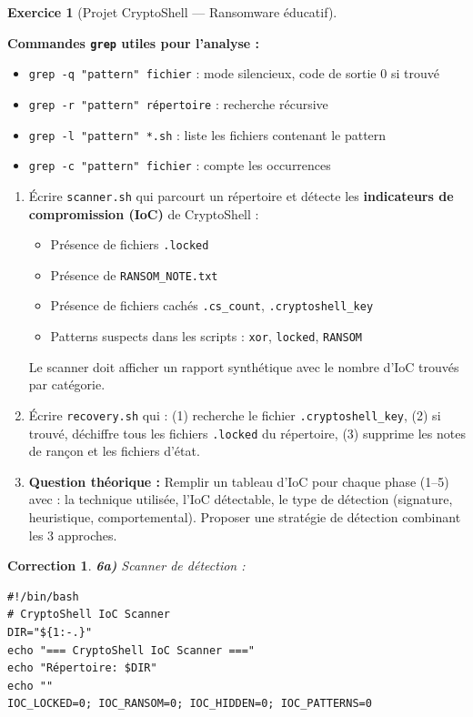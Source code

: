 \documentclass[a4paper,11pt]{article}
\theoremstyle{plain}
\newtheorem{correction}{Correction}
\theoremstyle{definition}
\newtheorem{exercice}{Exercice}
\begin{document}
\begin{exercice}[Projet CryptoShell --- Ransomware éducatif]
\begin{rappel}
\medskip
\textbf{Commandes \texttt{grep} utiles pour l'analyse :}
\begin{itemize}
    \item \texttt{grep -q "pattern" fichier} : mode silencieux, code de sortie 0 si trouvé
    \item \texttt{grep -r "pattern" répertoire} : recherche récursive
    \item \texttt{grep -l "pattern" *.sh} : liste les fichiers contenant le pattern
    \item \texttt{grep -c "pattern" fichier} : compte les occurrences
\end{itemize}
\end{rappel}

\begin{enumerate}
\item[\textbf{6a)}] Écrire \texttt{scanner.sh} qui parcourt un répertoire et détecte les \textbf{indicateurs de compromission (IoC)} de CryptoShell :
\begin{itemize}
    \item Présence de fichiers \texttt{.locked}
    \item Présence de \texttt{RANSOM\_NOTE.txt}
    \item Présence de fichiers cachés \texttt{.cs\_count}, \texttt{.cryptoshell\_key}
    \item Patterns suspects dans les scripts : \texttt{xor}, \texttt{locked}, \texttt{RANSOM}
\end{itemize}
Le scanner doit afficher un rapport synthétique avec le nombre d'IoC trouvés par catégorie.

\item[\textbf{6b)}] Écrire \texttt{recovery.sh} qui : (1) recherche le fichier \texttt{.cryptoshell\_key}, (2) si trouvé, déchiffre tous les fichiers \texttt{.locked} du répertoire, (3) supprime les notes de rançon et les fichiers d'état.

\item[\textbf{6c)}] \textbf{Question théorique :} Remplir un tableau d'IoC pour chaque phase (1--5) avec : la technique utilisée, l'IoC détectable, le type de détection (signature, heuristique, comportemental). Proposer une stratégie de détection combinant les 3 approches.
\end{enumerate}

\begin{correction}

\textbf{6a)} Scanner de détection :
\begin{lstlisting}[title=scanner.sh (phase6\_scanner.sh)]
#!/bin/bash
# CryptoShell IoC Scanner
DIR="${1:-.}"
echo "=== CryptoShell IoC Scanner ==="
echo "Répertoire: $DIR"
echo ""
IOC_LOCKED=0; IOC_RANSOM=0; IOC_HIDDEN=0; IOC_PATTERNS=0


\end{lstlisting}
\end{correction}
\end{exercice}
\end{document}
